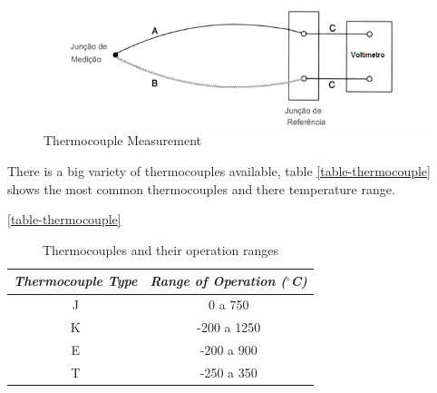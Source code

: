 	\begin{figure}[htbp]
		\centering
			\includegraphics[scale=0.75]{figuras/fig-thermocouple-measurement.jpg}
		\caption{Thermocouple Measurement \cite{termo-med}}
		\label{fig-thermocoupleMeasurement}
	\end{figure}
		
	There is a big variety of thermocouples available, table \ref{table-thermocouple} shows the most common thermocouples and there temperature range.

	\begin{table}[h!]
		\centering
		\caption{Thermocouples and their operation ranges}
		\ref{table-thermocouple}
		\begin{tabular}{|c|c|}
			\hline
			\textit{\textbf{Thermocouple Type}} & \textit{\textbf{Range of Operation ($^{\circ}$C)}} \\ \hline
			J & 0 a 750 \\ \hline
			K & -200 a 1250 \\ \hline
			E & -200 a 900 \\ \hline
			T & -250 a 350 \\ \hline
		\end{tabular}
	\end{table}
